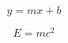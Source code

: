 \lipsum[2]

\begin{equation}
    y=mx+b
\end{equation}

\begin{equation}
    E=mc^2
\end{equation}

\lipsum[1-14]